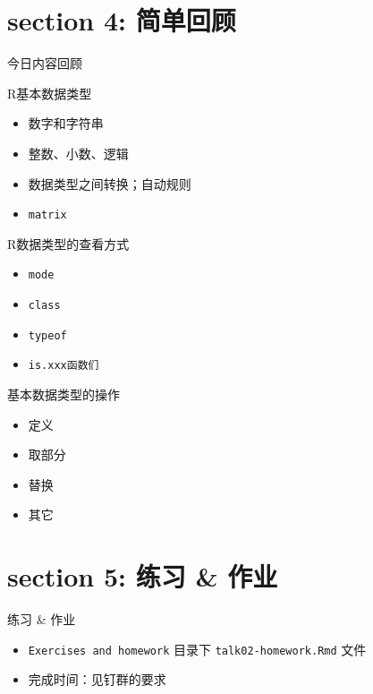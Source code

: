 \documentclass[ignorenonframetext,]{beamer}
\providecommand{\tightlist}{%
  \setlength{\itemsep}{0pt}\setlength{\parskip}{0pt}}
\begin{document}
\hypertarget{section-4-ux7b80ux5355ux56deux987e}{%
\section{section 4: 简单回顾}\label{section-4-ux7b80ux5355ux56deux987e}}

\begin{frame}[fragile]{今日内容回顾}
\protect\hypertarget{ux4ecaux65e5ux5185ux5bb9ux56deux987e}{}
\begin{block}{R基本数据类型}
\protect\hypertarget{rux57faux672cux6570ux636eux7c7bux578b}{}
\begin{itemize}
\tightlist
\item
  数字和字符串
\item
  整数、小数、逻辑
\item
  数据类型之间转换；自动规则
\item
  \texttt{matrix}
\end{itemize}
\end{block}

\begin{block}{R数据类型的查看方式}
\protect\hypertarget{rux6570ux636eux7c7bux578bux7684ux67e5ux770bux65b9ux5f0f}{}
\begin{itemize}
\tightlist
\item
  \texttt{mode}
\item
  \texttt{class}
\item
  \texttt{typeof}
\item
  \texttt{is.xxx函数们}
\end{itemize}
\end{block}

\begin{block}{基本数据类型的操作}
\protect\hypertarget{ux57faux672cux6570ux636eux7c7bux578bux7684ux64cdux4f5c}{}
\begin{itemize}
\tightlist
\item
  定义
\item
  取部分
\item
  替换
\item
  其它
\end{itemize}
\end{block}
\end{frame}

\hypertarget{section-5-ux7ec3ux4e60-ux4f5cux4e1a}{%
\section{section 5: 练习 \&
作业}\label{section-5-ux7ec3ux4e60-ux4f5cux4e1a}}

\begin{frame}[fragile]{练习 \& 作业}
\protect\hypertarget{ux7ec3ux4e60-ux4f5cux4e1a}{}
\begin{itemize}
\item
  \texttt{Exercises\ and\ homework} 目录下 \texttt{talk02-homework.Rmd}
  文件
\item
  完成时间：见钉群的要求
\end{itemize}
\end{frame}
\end{document}

